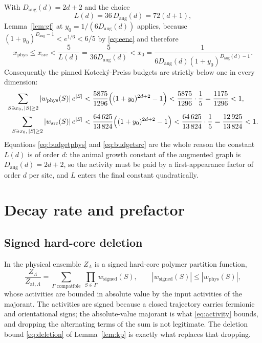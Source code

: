 \documentclass[11pt]{article}
\theoremstyle{plain}
\theoremstyle{definition}
\newcommand{\Daug}{D_{\mathrm{aug}}}
\begin{document}
With $\Daug(d)=2d+2$ and the choice
\begin{equation}\label{eq:L}
 L(d)=36\,\Daug(d)=72(d+1),
\end{equation}
Lemma~\ref{lem:gf} at $y_0=1/(6\Daug(d))$ applies, because
$(1+y_0)^{\Daug-1}<e^{1/6}<6/5$ by \eqref{eq:eenc} and therefore
\begin{equation}\label{eq:x0order}
 x_{\mathrm{phys}}\le x_{\mathrm{src}}<\frac{5}{L(d)}=\frac{5}{36\Daug(d)}
 <x_0=\frac{1}{6\Daug(d)(1+y_0)^{\Daug(d)-1}} .
\end{equation}
Consequently the pinned Koteck\'y-Preiss budgets are strictly below one in every
dimension:
\begin{align}
 \sum_{S\ni x_0,\,|S|\ge2}|w_{\mathrm{phys}}(S)|\,e^{|S|}
 &<\frac{5875}{1296}\Bigl((1+y_0)^{2d+2}-1\Bigr)
 <\frac{5875}{1296}\cdot\frac15=\frac{1175}{1296}<1,\label{eq:budgetphys}\\
 \sum_{S\ni x_0,\,|S|\ge2}|w_{\mathrm{src}}(S)|\,e^{|S|}
 &<\frac{64\,625}{13\,824}\Bigl((1+y_0)^{2d+2}-1\Bigr)
 <\frac{64\,625}{13\,824}\cdot\frac15=\frac{12\,925}{13\,824}<1.\label{eq:budgetsrc}
\end{align}
Equations \eqref{eq:budgetphys} and \eqref{eq:budgetsrc} are the whole reason the
constant $L(d)$ is of order $d$: the animal growth constant of the augmented graph is
$\Daug(d)=2d+2$, so the activity must be paid by a first-appearance factor of order
$d$ per site, and $L$ enters the final constant quadratically.

\section{Decay rate and prefactor}\label{sec:decay}

\subsection{Signed hard-core deletion}

In the physical ensemble $Z_\Lambda$ is a signed hard-core polymer partition
function,
\begin{equation}\label{eq:signed}
 \frac{Z_\Lambda}{Z_{\mathrm{at},\Lambda}}
 =\sum_{\Gamma\text{ compatible}}\ \prod_{S\in\Gamma}w_{\mathrm{signed}}(S),
 \qquad |w_{\mathrm{signed}}(S)|\le|w_{\mathrm{phys}}(S)| ,
\end{equation}
whose activities are bounded in absolute value by the input activities of the
majorant.
The activities are signed because a closed trajectory carries fermionic and
orientational signs; the absolute-value majorant is what \eqref{eq:activity} bounds,
and dropping the alternating terms of the sum is not legitimate. The deletion
bound \eqref{eq:deletion} of Lemma~\ref{lem:kp} is exactly what replaces that
dropping.
\end{document}
